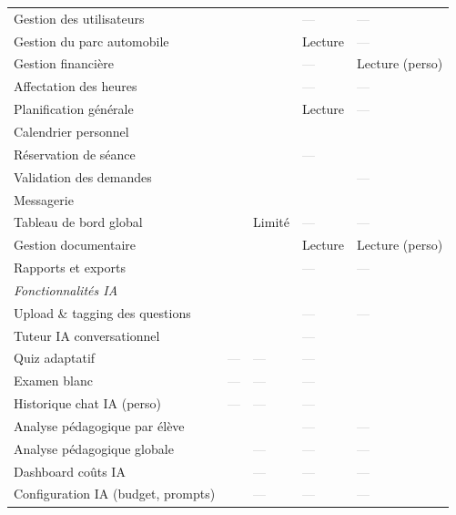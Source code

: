 \documentclass[12pt,a4paper]{article}
\newcommand{\yes}{\textcolor{primary}{\ding{51}}}
\newcommand{\nope}{\textcolor{darkgray}{---}}
\begin{document}
\begin{longtable}{p{4.8cm} >{\centering\arraybackslash}p{2.3cm} >{\centering\arraybackslash}p{2cm} >{\centering\arraybackslash}p{2cm} >{\centering\arraybackslash}p{2cm}}
    Gestion des utilisateurs & \yes & \yes & \nope & \nope \\
    \rowcolor{lightgray}
    Gestion du parc automobile & \yes & \yes & Lecture & \nope \\
    Gestion financière & \yes & \yes & \nope & Lecture (perso) \\
    \rowcolor{lightgray}
    Affectation des heures & \yes & \yes & \nope & \nope \\
    Planification générale & \yes & \yes & Lecture & \nope \\
    \rowcolor{lightgray}
    Calendrier personnel & \yes & \yes & \yes & \yes \\
    Réservation de séance & \yes & \yes & \nope & \yes \\
    \rowcolor{lightgray}
    Validation des demandes & \yes & \yes & \yes & \nope \\
    Messagerie & \yes & \yes & \yes & \yes \\
    \rowcolor{lightgray}
    Tableau de bord global & \yes & Limité & \nope & \nope \\
    Gestion documentaire & \yes & \yes & Lecture & Lecture (perso) \\
    \rowcolor{lightgray}
    Rapports et exports & \yes & \yes & \nope & \nope \\
    \multicolumn{5}{l}{\textit{\color{primary}Fonctionnalités IA}} \\
    Upload \& tagging des questions & \yes & \yes & \nope & \nope \\
    \rowcolor{lightgray}
    Tuteur IA conversationnel & \yes & \yes & \nope & \yes \\
    Quiz adaptatif & \nope & \nope & \nope & \yes \\
    \rowcolor{lightgray}
    Examen blanc & \nope & \nope & \nope & \yes \\
    Historique chat IA (perso) & \nope & \nope & \nope & \yes \\
    \rowcolor{lightgray}
    Analyse pédagogique par élève & \yes & \yes & \nope & \nope \\
    Analyse pédagogique globale & \yes & \nope & \nope & \nope \\
    \rowcolor{lightgray}
    Dashboard coûts IA & \yes & \nope & \nope & \nope \\
    Configuration IA (budget, prompts) & \yes & \nope & \nope & \nope \\
    \bottomrule
\end{longtable}
\end{document}
